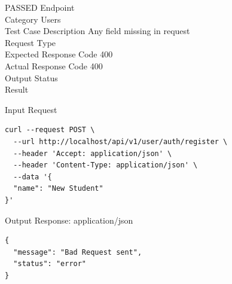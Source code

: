 \begin{testcase}{56}{PASSED}
Endpoint \hfill {}\\
Category \hfill Users\\
Test Case Description \hfill Any field missing in request\\

Request Type    \hfill {}\\
Expected Response Code    \hfill 400\\
Actual Response Code    \hfill 400\\

Output Status \hfill {}\\
Result \hfill {}

\begin{ipblock}{Input Request}
\begin{verbatim}
curl --request POST \
  --url http://localhost/api/v1/user/auth/register \
  --header 'Accept: application/json' \
  --header 'Content-Type: application/json' \
  --data '{
  "name": "New Student"
}'
\end{verbatim}
\end{ipblock}

\begin{opblock}{Output Response: application/json}
\begin{verbatim}
{
  "message": "Bad Request sent",
  "status": "error"
}
\end{verbatim}
\end{opblock}
\end{testcase}

